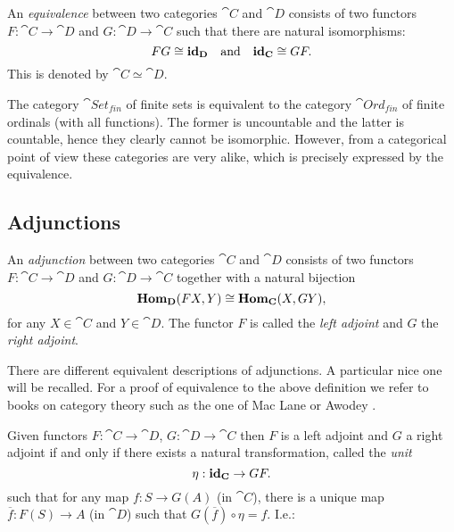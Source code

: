 \begin{definition}
	An \emph{equivalence} between two categories $\cat{C}$ and $\cat{D}$ consists of two functors $F:\cat{C} \to \cat{D}$ and $G: \cat{D} \to \cat{C}$ such that there are natural isomorphisms:
	$$ FG \cong \mathbf{id}_{\mathbf{D}} \quad\text{and}\quad \mathbf{id}_{\mathbf{C}} \cong GF. $$
	This is denoted by $\cat{C} \simeq \cat{D}$.
\end{definition}

\begin{example}
	The category $\cat{Set_{fin}}$ of finite sets is equivalent to the category $\cat{Ord_{fin}}$ of finite ordinals (with all functions). The former is uncountable and the latter is countable, hence they clearly cannot be isomorphic. However, from a categorical point of view these categories are very alike, which is precisely expressed by the equivalence.
\end{example}

\subsection{Adjunctions}
\begin{definition}
	An \emph{adjunction} between two categories $\cat{C}$ and $\cat{D}$ consists of two functors $F:\cat{C} \to \cat{D}$ and $G: \cat{D} \to \cat{C}$ together with a natural bijection
	$$ \mathbf{Hom}_{\mathbf{D}}(FX, Y) \cong \mathbf{Hom}_{\mathbf{C}}(X, GY), $$
	for any $X \in \cat{C}$ and $Y \in \cat{D}$. The functor $F$ is called the \emph{left adjoint} and $G$ the \emph{right adjoint}.
\end{definition}

There are different equivalent descriptions of adjunctions. A particular nice one will be recalled. For a proof of equivalence to the above definition we refer to books on category theory such as the one of Mac Lane \cite{maclane} or Awodey \cite{awodey}.

\begin{lemma}
	Given functors $F:\cat{C} \to \cat{D}$, $G: \cat{D} \to \cat{C}$ then $F$ is a left adjoint and $G$ a right adjoint if and only if there exists a natural transformation, called the \emph{unit}
	$$ \eta : \mathbf{id}_{\mathbf{C}} \to GF. $$
	such that for any map $f: S \to G(A)$ (in $\cat{C}$), there is a unique map $\overline{f}: F(S) \to A$ (in $\cat{D}$) such that $G(\overline{f}) \circ \eta = f$. I.e.:
\begin{center}
\end{center}
\end{lemma}


